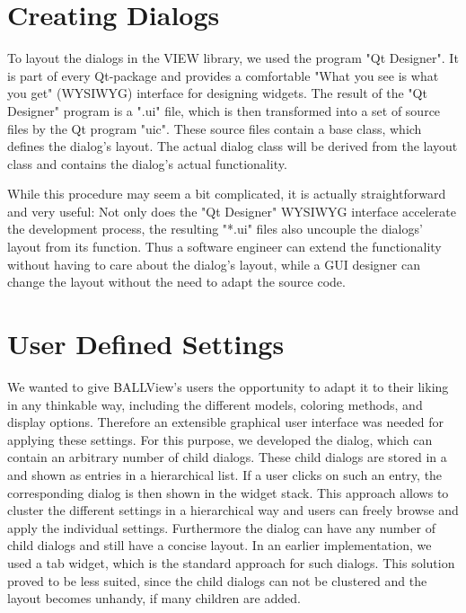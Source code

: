 \section{Creating Dialogs}
\label{designer}

To layout the dialogs in the VIEW library, we used the program "Qt Designer".
It is part of every Qt-package and provides a comfortable "What you see is what
you get" (WYSIWYG) interface for designing widgets. The result of the "Qt 
Designer" program is a ".ui" file, which is then transformed into a set of \CPP
source files by the Qt program "uic". These source files contain a base class, 
which defines the dialog's layout. The actual dialog class will be derived from
the layout class and contains the dialog's actual functionality.

While this procedure may seem a bit complicated, it is actually straightforward
and very useful: Not only does the "Qt Designer" WYSIWYG interface accelerate 
the development process, the resulting "*.ui" files also uncouple the dialogs' 
layout from its function. Thus a software engineer can extend the functionality
without having to care about the dialog's layout, while a GUI designer can 
change the layout without the need to adapt the source code.


\section{User Defined Settings}
\label{preferences}

We wanted to give BALLView's users the opportunity to adapt it to their liking 
in any thinkable way, including the different models, coloring methods, and 
display options. Therefore an extensible graphical user interface was needed 
for applying these settings. For this purpose, we developed the 
 dialog, which can contain an arbitrary number of child 
dialogs. These child dialogs are stored in a  and shown 
as entries in a hierarchical list. If a user clicks on such an entry, the 
corresponding dialog is then shown in the widget stack. This approach allows 
to cluster the different settings in a hierarchical way and users can freely 
browse and apply the individual settings. Furthermore the  
dialog can have any number of child dialogs and still have a concise layout.
In an earlier implementation, we used a tab widget, which is the standard 
approach for such dialogs. This solution proved to be less suited, since the 
child dialogs can not be clustered and the layout becomes unhandy, if many 
children are added.

